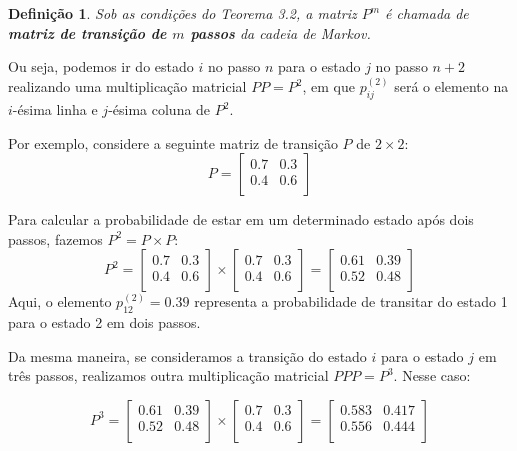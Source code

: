 \documentclass[12pt]{article}
\theoremstyle{break}
\newtheorem{definition}{Definição}[section]
\begin{document}
\begin{definition}
Sob as condições do Teorema 3.2, a matriz \( P^m \) é chamada de \textbf{matriz de transição de \( m \) passos} da cadeia de Markov.
\end{definition}

Ou seja, podemos ir do estado \( i \) no passo \( n \) para o estado \( j \) no passo \( n+2 \) realizando uma multiplicação matricial \( PP = P^2 \), em que \( p_{ij}^{(2)} \) será o elemento na \( i \)-ésima linha e \( j \)-ésima coluna de \( P^2 \). 

Por exemplo, considere a seguinte matriz de transição \( P \) de \( 2 \times 2 \):
\[
P = \begin{bmatrix}
0.7 & 0.3 \\
0.4 & 0.6 \\
\end{bmatrix}
\]

Para calcular a probabilidade de estar em um determinado estado após dois passos, fazemos \( P^2 = P \times P \):
\[
P^2 = \begin{bmatrix}
0.7 & 0.3 \\
0.4 & 0.6 \\
\end{bmatrix}
\times
\begin{bmatrix}
0.7 & 0.3 \\
0.4 & 0.6 \\
\end{bmatrix}
= \begin{bmatrix}
0.61 & 0.39 \\
0.52 & 0.48 \\
\end{bmatrix}
\]
Aqui, o elemento \( p_{12}^{(2)} = 0.39 \) representa a probabilidade de transitar do estado 1 para o estado 2 em dois passos.

Da mesma maneira, se consideramos a transição do estado \( i \) para o estado \( j \) em três passos, realizamos outra multiplicação matricial \( PPP = P^3 \). Nesse caso:

\[
P^3 = \begin{bmatrix}
0.61 & 0.39 \\
0.52 & 0.48 \\
\end{bmatrix}
\times
\begin{bmatrix}
0.7 & 0.3 \\
0.4 & 0.6 \\
\end{bmatrix}
= \begin{bmatrix}
0.583 & 0.417 \\
0.556 & 0.444 \\
\end{bmatrix}
\]
\end{document}

